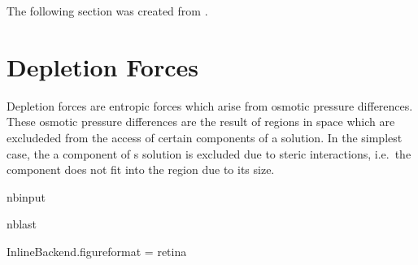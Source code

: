 \documentclass[letterpaper,10pt,english]{sphinxmanual}
\begin{document}
\sphinxAtStartPar
The following section was created from .


\chapter{Depletion Forces}
\label{\detokenize{notebooks/L12/1_depletion_forces:Depletion-Forces}}\label{\detokenize{notebooks/L12/1_depletion_forces::doc}}
\sphinxAtStartPar
Depletion forces are entropic forces which arise from osmotic pressure differences. These osmotic pressure differences are the result of regions in space which are excludeded from the access of certain components of a solution. In the simplest case, the a component of s solution is excluded due to steric interactions, i.e. the component does not fit into the region due to its size.

\begin{sphinxuseclass}{nbinput}
\begin{sphinxuseclass}{nblast}
{
\begin{sphinxVerbatim}[commandchars=\\\{\}]
\llap{\color{nbsphinxin}[55]:\,\hspace{\fboxrule}\hspace{\fboxsep}}   
   
   
   
 

 InlineBackend.figure\PYGZus{}format = \PYGZsq{}retina\PYGZsq{}

    
      

\end{sphinxVerbatim}
}

\end{sphinxuseclass}
\end{sphinxuseclass}
\end{document}
